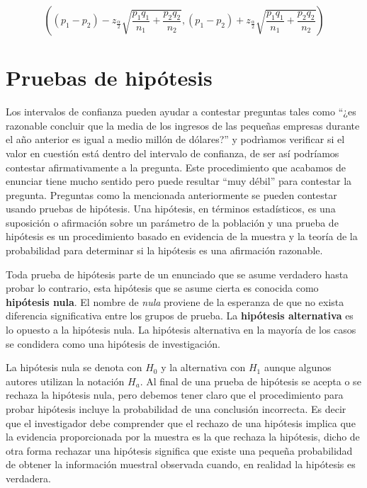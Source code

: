 \documentclass[letterpaper,]{book}
\begin{document}
\begin{equation} 
\left( \left( p_1 - p_2 \right) - z_{\frac{\alpha}{2}}\sqrt{\dfrac{p_1q_1}{n_1} + \dfrac{p_2q_2}{n_2}} , \left( p_1 - p_2 \right) + z_{\frac{\alpha}{2}}\sqrt{\dfrac{p_1q_1}{n_1} + \dfrac{p_2q_2}{n_2}}  \right)
\label{eq:icprop2}
\end{equation}

\hypertarget{ph}{%
\section{Pruebas de hipótesis}\label{ph}}

Los intervalos de confianza pueden ayudar a contestar preguntas tales como ``¿es razonable concluir que la media de los ingresos de las pequeñas empresas durante el año anterior es igual a medio millón de dólares?'' y podrìamos verificar si el valor en cuestión está dentro del intervalo de confianza, de ser así podríamos contestar afirmativamente a la pregunta. Este procedimiento que acabamos de enunciar tiene mucho sentido pero puede resultar ``muy débil'' para contestar la pregunta. Preguntas como la mencionada anteriormente se pueden contestar usando pruebas de hipótesis. Una hipótesis, en términos estadísticos, es una suposición o afirmación sobre un parámetro de la población y una prueba de hipótesis es un procedimiento basado en evidencia de la muestra y la teoría de la probabilidad para determinar si la hipótesis es una afirmación razonable.

Toda prueba de hipótesis parte de un enunciado que se asume verdadero hasta probar lo contrario, esta hipótesis que se asume cierta es conocida como \textbf{hipótesis nula}. El nombre de \emph{nula} proviene de la esperanza de que no exista diferencia significativa entre los grupos de prueba. La \textbf{hipótesis alternativa} es lo opuesto a la hipótesis nula. La hipótesis alternativa en la mayoría de los casos se condidera como una hipótesis de investigación.

La hipótesis nula se denota con \(H_0\) y la alternativa con \(H_1\) aunque algunos autores utilizan la notación \(H_a\). Al final de una prueba de hipótesis se acepta o se rechaza la hipótesis nula, pero debemos tener claro que el procedimiento para probar hipótesis incluye la probabilidad de una conclusión incorrecta. Es decir que el investigador debe comprender que el rechazo de una hipótesis implica que la evidencia proporcionada por la muestra es la que rechaza la hipótesis, dicho de otra forma rechazar una hipótesis significa que existe una pequeña probabilidad de obtener la información muestral observada cuando, en realidad la hipótesis es verdadera.
\end{document}
